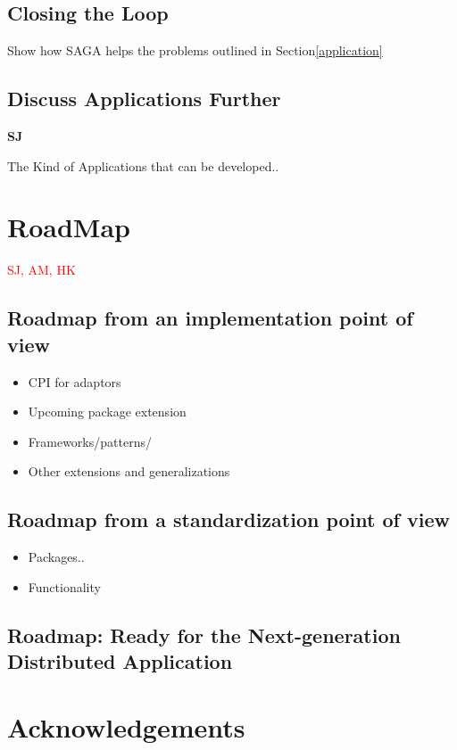 \documentclass[10pt,letterpaper]{article}
\newcommand{\note}[1]{ {\textcolor{red}    { #1 }}}
\newcommand{\note}[1]{}
\begin{document}
\subsection{Closing the Loop}

Show how SAGA helps the problems outlined in Section\ref{application}

\subsection{Discuss Applications Further} {\bf SJ}
 
The Kind of Applications that can be developed..

\section{RoadMap} \note{SJ, AM, HK}

\subsection*{Roadmap from an implementation point of view}
\begin{itemize}
\item CPI for adaptors
\item Upcoming package extension
\item Frameworks/patterns/
\item Other extensions and generalizations
\end{itemize}

\subsection*{Roadmap from a standardization point of view}

\begin{itemize}
\item Packages.. 
\item Functionality
\end{itemize}

\subsection*{Roadmap: Ready for the Next-generation Distributed Application}

\section*{Acknowledgements}


%


\end{document}
